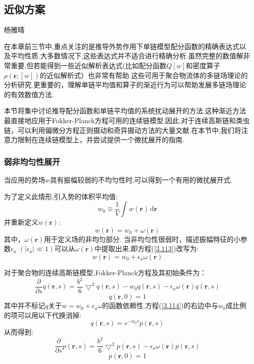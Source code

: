 \subsection{近似方案}
\begin{center}
	杨雅晴
\end{center}

在本章前三节中,重点关注的是推导外势作用下单链模型配分函数的精确表达式以及平均性质.大多数情况下,这些表达式并不适合进行精确分析.虽然完整的数值解非常重要,但若能得到一些近似解析表达式(比如配分函数$Q[w]$和密度算子$\rho(\mathbf{r};[w])$的近似解析式）也非常有帮助.这些可用于聚合物流体的多链场理论的分析研究.更重要的，理解单链平均值和算子的渐近行为可以帮助发展多链场理论的有效数值方法.

本节将集中讨论推导配分函数和单链平均值的系统扰动展开的方法.这种渐近方法最直接地应用于Fokker-Planck方程可用的连续链模型.因此,对于连续高斯链和类虫链，可以利用偏微分方程正则摄动和奇异摄动方法的大量文献.在本节中,我们将注意力限制在连续链模型上，并尝试提供一个微扰展开的指南.
\subsubsection{弱非均匀性展开}
当应用的势场$w$具有振幅较弱的不均匀性时,可以得到一个有用的微扰展开式.

为了定义此情形,引入势的体积平均值:
\begin{equation}
w_0\equiv \frac{1}{V} \int w(\mathbf{r})\,\mathrm{d}\mathbf{r}
\end{equation}
并重新定义$w(\mathbf{r})$:
\begin{equation}
w(\mathbf{r})=w_0+\omega(\mathbf{r}) \label{3.113}
\end{equation}
其中，$\omega(\mathbf{r})$用于定义场的非均匀部分.
当非均匀性很弱时，描述振幅特征的小参数$\epsilon_a$ $(|\epsilon_a| \ll 1)$可以从$\omega(\mathbf{r})$中提取出来,即方程(\ref{3.113})改写为:
$$w(\mathbf{r})=w_0+\epsilon_a \omega(\mathbf{r})$$

对于聚合物的连续高斯链模型,Fokker-Planck方程及其初始条件为：
\begin{equation}
\frac{\partial}{\partial s} q(\mathbf{r},s) = \frac{b^2}{6} \bigtriangledown^2 q(\mathbf{r},s) -w_0 q(\mathbf{r},s) -\epsilon_a \omega(\mathbf{r}) q(\mathbf{r},s) \label{3.114}
\end{equation}
\begin{equation}
q(\mathbf{r},0) = 1 \label{3.115}
\end{equation}
其中并不标记$q$关于$w = w_0+\epsilon_a \omega$的函数依赖性.方程(\ref{3.114})的右边中与$w_0$成比例的项可以用以下代换消掉:
\begin{equation}
q(\mathbf{r},s) = e^{-w_0 s} p(\mathbf{r},s) \label{3.116}
\end{equation}
从而得到:
\begin{equation}
\frac{\partial}{\partial s} p(\mathbf{r},s) = \frac{b^2}{6} \bigtriangledown^2 p(\mathbf{r},s) -\epsilon_a \omega(\mathbf{r}) p(\mathbf{r},s) \label{3.117}
\end{equation}
\begin{equation}
p(\mathbf{r},0) = 1 \label{3.118}
\end{equation}

